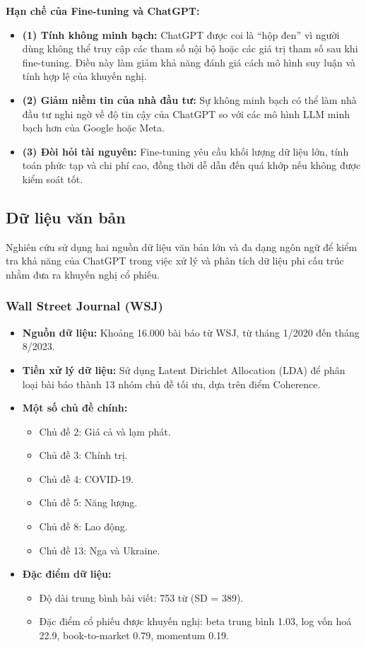 \documentclass[a4paper,12pt]{article}
\begin{document}
\noindent
\textbf{Hạn chế của Fine-tuning và ChatGPT:}
\begin{itemize}
    \item \textbf{(1) Tính không minh bạch:} ChatGPT được coi là “hộp đen” vì người dùng không thể truy cập các tham số nội bộ hoặc các giá trị tham số sau khi fine-tuning. Điều này làm giảm khả năng đánh giá cách mô hình suy luận và tính hợp lệ của khuyến nghị.
    \item \textbf{(2) Giảm niềm tin của nhà đầu tư:} Sự không minh bạch có thể làm nhà đầu tư nghi ngờ về độ tin cậy của ChatGPT so với các mô hình LLM minh bạch hơn của Google hoặc Meta.
    \item \textbf{(3) Đòi hỏi tài nguyên:} Fine-tuning yêu cầu khối lượng dữ liệu lớn, tính toán phức tạp và chi phí cao, đồng thời dễ dẫn đến quá khớp nếu không được kiểm soát tốt.
\end{itemize}

\subsection{Dữ liệu văn bản}

Nghiên cứu sử dụng hai nguồn dữ liệu văn bản lớn và đa dạng ngôn ngữ để kiểm tra khả năng của ChatGPT trong việc xử lý và phân tích dữ liệu phi cấu trúc nhằm đưa ra khuyến nghị cổ phiếu.

\subsubsection{Wall Street Journal (WSJ)}
\begin{itemize}
    \item \textbf{Nguồn dữ liệu:} Khoảng 16.000 bài báo từ WSJ, từ tháng 1/2020 đến tháng 8/2023.
    \item \textbf{Tiền xử lý dữ liệu:} Sử dụng Latent Dirichlet Allocation (LDA) để phân loại bài báo thành 13 nhóm chủ đề tối ưu, dựa trên điểm Coherence.
    \item \textbf{Một số chủ đề chính:}
    \begin{itemize}
        \item Chủ đề 2: Giá cả và lạm phát.
        \item Chủ đề 3: Chính trị.
        \item Chủ đề 4: COVID-19.
        \item Chủ đề 5: Năng lượng.
        \item Chủ đề 8: Lao động.
        \item Chủ đề 13: Nga và Ukraine.
    \end{itemize}
    \item \textbf{Đặc điểm dữ liệu:}
    \begin{itemize}
        \item Độ dài trung bình bài viết: 753 từ (SD = 389).
        \item Đặc điểm cổ phiếu được khuyến nghị: beta trung bình 1.03, log vốn hoá 22.9, book-to-market 0.79, momentum 0.19.
    \end{itemize}
\end{itemize}
\end{document}
